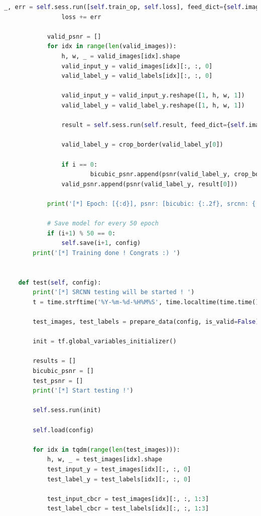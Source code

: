 \documentclass[11pt,UTF8]{ctexart}
\begin{document}
\begin{lstlisting}[language={python}]
                _, err = self.sess.run([self.train_op, self.loss], feed_dict={self.images: batch_images, self.labels: batch_labels})
                loss += err

            valid_psnr = []
            for idx in range(len(valid_images)):
                h, w, _ = valid_images[idx].shape
                valid_input_y = valid_images[idx][:, :, 0]
                valid_label_y = valid_labels[idx][:, :, 0]

                valid_input_y = valid_input_y.reshape([1, h, w, 1])
                valid_label_y = valid_label_y.reshape([1, h, w, 1])

                result = self.sess.run(self.result, feed_dict={self.images: valid_input_y, self.labels: valid_label_y})
                
                valid_label_y = crop_border(valid_label_y[0])

                if i == 0:
                        bicubic_psnr.append(psnr(valid_label_y, crop_border(valid_input_y[0])))
                valid_psnr.append(psnr(valid_label_y, result[0]))
                
            print('[*] Epoch: [{:d}], psnr: [bicubic: {:.2f}, srcnn: {:.2f}], loss: [{:.8f}]'.format(i+1, np.mean(bicubic_psnr), np.mean(valid_psnr), loss/batch_idxs))
            
            # Save model for every 50 epoch
            if (i+1) % 50 == 0:
                self.save(i+1, config)
        print('[*] Training done ! Congrats :) ')
    

    def test(self, config):
        print('[*] SRCNN testing will be started ! ')
        t = time.strftime('%Y-%m-%d-%H%M%S', time.localtime(time.time()))

        test_images, test_labels = prepare_data(config, is_valid=False)

        init = tf.global_variables_initializer()

        results = []
        bicubic_psnr = []
        test_psnr = []
        print('[*] Start testing !')
        
        self.sess.run(init)
        
        self.load(config)

        for idx in tqdm(range(len(test_images))):
            h, w, _ = test_images[idx].shape
            test_input_y = test_images[idx][:, :, 0]
            test_label_y = test_labels[idx][:, :, 0]

            test_input_cbcr = test_images[idx][:, :, 1:3]
            test_label_cbcr = test_labels[idx][:, :, 1:3]


\end{lstlisting}
\end{document}
